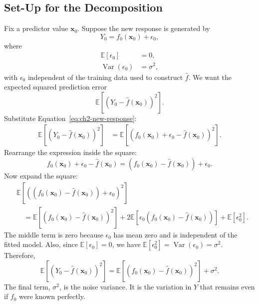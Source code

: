 {\subsection{Set-Up for the Decomposition}

Fix a predictor value $\mathbf{x}_0$.  Suppose the new response is generated by
\begin{equation}
  Y_0=f_0(\mathbf{x}_0)+\epsilon_0,
  \label{eq:ch2-new-response}
\end{equation}
where
\begin{align*}
  \mathbb{E}[\epsilon_0] &= 0,\\
  \operatorname{Var}(\epsilon_0) &= \sigma^2,
\end{align*}
with $\epsilon_0$ independent of the training data used to construct $\hat f$.  We want the expected squared prediction error
\[
  \mathbb{E}\left[\left(Y_0-\hat f(\mathbf{x}_0)\right)^2\right].
\]
Substitute Equation~\eqref{eq:ch2-new-response}:
\begin{align}
  \mathbb{E}\left[\left(Y_0-\hat f(\mathbf{x}_0)\right)^2\right]
  &= \mathbb{E}\left[\left(f_0(\mathbf{x}_0)+\epsilon_0-\hat f(\mathbf{x}_0)\right)^2\right].
  \label{eq:ch2-substitution}
\end{align}
Rearrange the expression inside the square:
\[
  f_0(\mathbf{x}_0)+\epsilon_0-\hat f(\mathbf{x}_0)
  = \left(f_0(\mathbf{x}_0)-\hat f(\mathbf{x}_0)\right)+\epsilon_0.
\]
Now expand the square:
\begin{align*}
  &\mathbb{E}\left[\left(\left(f_0(\mathbf{x}_0)-\hat f(\mathbf{x}_0)\right)+\epsilon_0\right)^2\right] \\
  &\quad = \mathbb{E}\left[\left(f_0(\mathbf{x}_0)-\hat f(\mathbf{x}_0)\right)^2\right]
  +2\mathbb{E}\left[\epsilon_0\left(f_0(\mathbf{x}_0)-\hat f(\mathbf{x}_0)\right)\right]
  +\mathbb{E}[\epsilon_0^2].
\end{align*}
The middle term is zero because $\epsilon_0$ has mean zero and is independent of the fitted model.  Also, since $\mathbb{E}[\epsilon_0]=0$, we have $\mathbb{E}[\epsilon_0^2]=\operatorname{Var}(\epsilon_0)=\sigma^2$.  Therefore,
\begin{equation}
  \mathbb{E}\left[\left(Y_0-\hat f(\mathbf{x}_0)\right)^2\right]
  = \mathbb{E}\left[\left(f_0(\mathbf{x}_0)-\hat f(\mathbf{x}_0)\right)^2\right]
  + \sigma^2.
  \label{eq:ch2-mse-signal-plus-noise}
\end{equation}
The final term, $\sigma^2$, is the noise variance.  It is the variation in $Y$ that remains even if $f_0$ were known perfectly.

}
